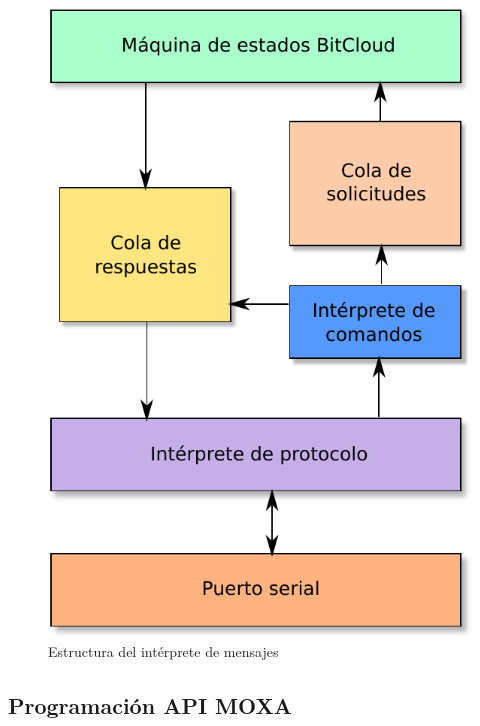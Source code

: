 \begin{figure}
	\centering
	\includegraphics[scale=0.5]{capitulo_3_imgs/estructura_interprete.pdf}
	\caption{Estructura del intérprete de mensajes}
	\label{fig:interprete_mensajes}
\end{figure}


\subsection{Programación API MOXA}